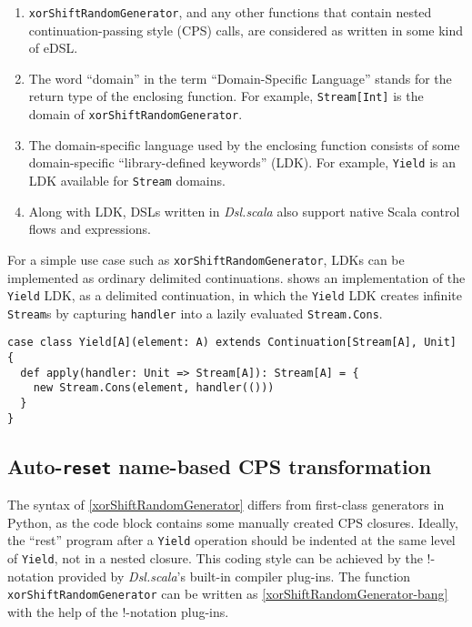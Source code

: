 \begin{enumerate}
  \item \lstinline{xorShiftRandomGenerator}, and any other functions that contain nested continuation-passing style (CPS) calls, are considered as written in some kind of eDSL.
  \item The word ``domain'' in the term ``Domain-Specific Language'' stands for the return type of the enclosing function. For example, \lstinline{Stream[Int]} is the domain of \lstinline{xorShiftRandomGenerator}.
  \item The domain-specific language used by the enclosing function consists of some domain-specific ``library-defined keywords'' (LDK). For example, \lstinline{Yield} is an LDK available for \lstinline{Stream} domains.
  \item Along with LDK, DSLs written in \textit{Dsl.scala} also support native Scala control flows and expressions.
\end{enumerate}

For a simple use case such as \lstinline{xorShiftRandomGenerator}, LDKs can be implemented as ordinary delimited continuations.  shows an implementation of the \lstinline{Yield} LDK, as a delimited continuation, in which the \lstinline{Yield} LDK creates infinite \lstinline{Stream}s by capturing \lstinline{handler} into a lazily evaluated \lstinline{Stream.Cons}.

\begin{lstlisting}[caption={Implementing \lstinline{Yield} LDK as an ordinary delimited continuation},label={NonadaptiveYield}]
case class Yield[A](element: A) extends Continuation[Stream[A], Unit] {
  def apply(handler: Unit => Stream[A]): Stream[A] = {
    new Stream.Cons(element, handler(()))
  }
}
\end{lstlisting}

\subsection{Auto-\lstinline{reset} name-based CPS transformation}\label{CPS transformation}

The syntax of \cref{xorShiftRandomGenerator} differs from first-class generators in Python, as the code block contains some manually created CPS closures. Ideally, the ``rest'' program after a \lstinline{Yield} operation should be indented at the same level of \lstinline{Yield}, not in a nested closure. This coding style can be achieved by the !-notation provided by \textit{Dsl.scala}'s built-in compiler plug-ins. The function \lstinline{xorShiftRandomGenerator} can be written as \cref{xorShiftRandomGenerator-bang} with the help of the !-notation plug-ins.

